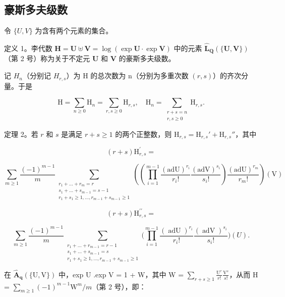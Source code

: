 \subsection{豪斯多夫级数}

令 \(\{U, V\}\) 为含有两个元素的集合。

定义 1。李代数 \(\mathbf{H} = \mathbf{U} \uplus \mathbf{V} = \log (\exp \mathbf{U} \cdot \exp \mathbf{V})\) 中的元素 \(\hat{\mathbf{L}}_{\mathbf{Q}}(\{\mathbf{U}, \mathbf{V}\})\)（第 2 号）称为关于不定元 \(\mathbf{U}\) 和 \(\mathbf{V}\) 的豪斯多夫级数。

记 \(H_{n}\)（分别记 \(H_{r,s}\)）为 H 的总次数为 n（分别为多重次数 \((r, s)\)）的齐次分量。于是

\[
\mathrm{H} = \sum_ {n \geqslant 0} \mathrm{H} _ {n} = \sum_ {r, s \geqslant 0} \mathrm{H} _ {r, s}, \quad \mathrm{H} _ {n} = \sum_ {\substack {r + s = n \\ r, s \geqslant 0}} \mathrm{H} _ {r, s}.\tag{8}
\]

定理 2。若 \(r\) 和 \(s\) 是满足 \(r + s \geqslant 1\) 的两个正整数，则 \(\mathrm{H}_{r,s} = \mathrm{H}_{r,s}' + \mathrm{H}_{r,s}''\)，其中

\[
(r + s) \mathrm{H} _ {r, s} ^ {\prime} = \tag {9}
\]

\[
\sum_{m\geqslant 1}\frac{(-1)^{m - 1}}{m}\sum_{\substack{r_{1} + \dots +r_{m} = r\\ s_{1} + \dots +s_{m - 1} = s - 1\\ r_{1} + s_{1}\geqslant 1,\ldots ,r_{m - 1} + s_{m - 1}\geqslant 1}}\left(\left(\prod_{i = 1}^{m - 1}\frac{(\mathrm{adU})^{r_{i}}}{r_{i}!}\frac{(\mathrm{adV})^{s_{i}}}{s_{i}!}\right)\frac{(\mathrm{adU})^{r_{m}}}{r_{m}!}\right)(\mathrm{V})
\]

\[
(r + s) \mathrm{H} _ {r, s} ^ {\prime \prime} = \tag {10}
\]

\[
\sum_{m\geqslant 1}\frac{(-1)^{m - 1}}{m}\sum_{\substack{r_{1} + \dots +r_{m - 1} = r - 1\\ s_{1} + \dots +s_{m - 1} = s\\ r_{1} + s_{1}\geqslant 1,\dots ,r_{m - 1} + s_{m - 1}\geqslant 1}}\Bigg(\prod_{i = 1}^{m - 1}\frac{(\operatorname{adU})^{r_{i}}}{r_{i}!}\frac{(\operatorname{adV})^{s_{i}}}{s_{i}!}\Bigg)(U).
\]

在 \(\hat{\mathbf{A}}_{\mathbf{q}}(\{\mathrm{U},\mathrm{V}\})\) 中，exp U .exp V = 1 + W，其中 W = \(\sum_{r+s\geqslant 1}\frac{\mathrm{U}^r}{r!}\frac{\mathrm{V}^s}{s!}\)，从而 H = \(\sum_{m\geqslant 1}(-1)^{m - 1}\mathrm{W}^m /m\)（第 2 号），即：

